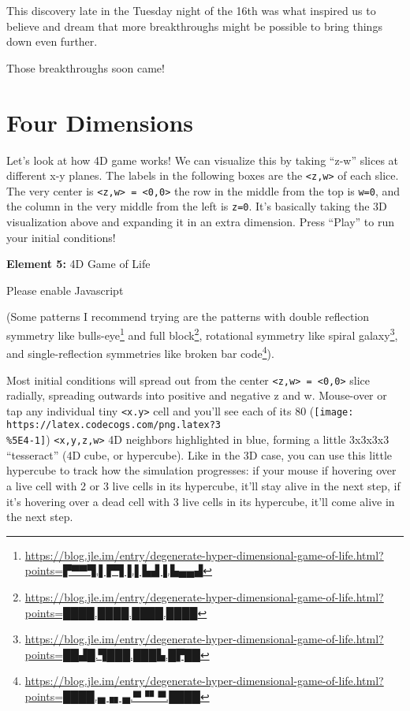 \documentclass[]{article}
\renewcommand{\href}[2]{#2\footnote{\url{#1}}}
\begin{document}
This discovery late in the Tuesday night of the 16th was what inspired us to
believe and dream that more breakthroughs might be possible to bring things down
even further.

Those breakthroughs soon came!

\hypertarget{four-dimensions}{%
\section{Four Dimensions}\label{four-dimensions}}

Let's look at how 4D game works! We can visualize this by taking ``z-w'' slices
at different x-y planes. The labels in the following boxes are the
\texttt{\textless{}z,w\textgreater{}} of each slice. The very center is
\texttt{\textless{}z,w\textgreater{}\ =\ \textless{}0,0\textgreater{}} the row
in the middle from the top is \texttt{w=0}, and the column in the very middle
from the left is \texttt{z=0}. It's basically taking the 3D visualization above
and expanding it in an extra dimension. Press ``Play'' to run your initial
conditions!

\leavevmode\hypertarget{gol4D}{}%
\textbf{Element 5:} 4D Game of Life

\leavevmode\hypertarget{gol4DCont}{}%
Please enable Javascript

(Some patterns I recommend trying are the patterns with double reflection
symmetry like
\href{https://blog.jle.im/entry/degenerate-hyper-dimensional-game-of-life.html?points=▛▀▀▜.▌▛▜▐.▌▙▟▐.▙▄▄▟}{bulls-eye}
and
\href{https://blog.jle.im/entry/degenerate-hyper-dimensional-game-of-life.html?points=████.████.████.████}{full
block}, rotational symmetry like
\href{https://blog.jle.im/entry/degenerate-hyper-dimensional-game-of-life.html?points=██▟█.▜███.███▙.█▛██}{spiral
galaxy}, and single-reflection symmetries like
\href{https://blog.jle.im/entry/degenerate-hyper-dimensional-game-of-life.html?points=████.▄▗▖▄.▀▝▘▀.████}{broken
bar code}).

Most initial conditions will spread out from the center
\texttt{\textless{}z,w\textgreater{}\ =\ \textless{}0,0\textgreater{}} slice
radially, spreading outwards into positive and negative z and w. Mouse-over or
tap any individual tiny \texttt{\textless{}x.y\textgreater{}} cell and you'll
see each of its 80
(\texttt{[image: https://latex.codecogs.com/png.latex?3\\\%5E4-1]})
\texttt{\textless{}x,y,z,w\textgreater{}} 4D neighbors highlighted in blue,
forming a little 3x3x3x3 ``tesseract'' (4D cube, or hypercube). Like in the 3D
case, you can use this little hypercube to track how the simulation progresses:
if your mouse if hovering over a live cell with 2 or 3 live cells in its
hypercube, it'll stay alive in the next step, if it's hovering over a dead cell
with 3 live cells in its hypercube, it'll come alive in the next step.
\end{document}

